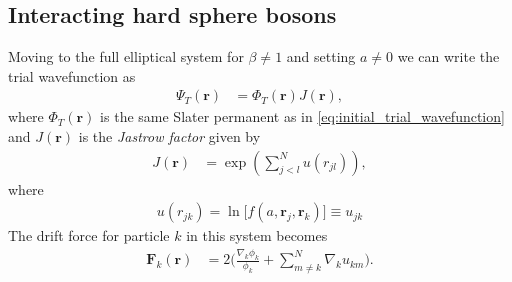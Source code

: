 \documentclass[
    a4paper, aps, twocolumn, floatfix, superscriptaddress,
    nofootinbib]{revtex4-1}
\newcommand{\vf}{\mathbf}
\newcommand{\1}{\mathds{1}}
\newcommand{\para}[1]{\left(#1\right)}
\begin{document}
    \subsection{Interacting hard sphere bosons}
        Moving to the full elliptical system for $\beta \neq 1$ and setting $a
        \neq 0$ we can write the trial wavefunction as
        \begin{align}
            \Psi_T(\vf{r})
            &=
            \Phi_T(\vf{r})
            J(\vf{r}),
        \end{align}
        where $\Phi_T(\vf{r})$ is the same Slater permanent as in
        \autoref{eq:initial_trial_wavefunction} and $J(\vf{r})$ is the
        \emph{Jastrow factor} given by
        \begin{align}
            J(\vf{r})
            &=
            \exp\para{
                \sum_{j < l}^N u(r_{jl})
            },
        \end{align}
        where
        \begin{align}
            u(r_{jk})
            = \ln\bigl[f(a, \vf{r}_j, \vf{r}_k)\bigr]
            \equiv u_{jk}
        \end{align}
        The drift force for particle $k$ in this system becomes
        \begin{align}
            \vf{F}_k(\vf{r})
            &=
            2\Biggl(
                \frac{\nabla_k\phi_k}{\phi_k}
                + \sum_{m \neq k}^N
                \nabla_k u_{km}
            \Biggr).
        \end{align}
\end{document}
